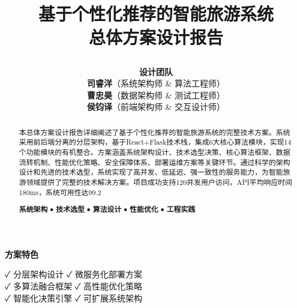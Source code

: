 \documentclass[12pt,a4paper]{article}
\title{
    \vspace{-2cm}
    \begin{tcolorbox}[
        colback=primary,
        coltext=white,
        halign=center,
        rounded corners=10pt,
        drop shadow
    ]
    \huge\textbf{基于个性化推荐的智能旅游系统}\\[0.5cm]
    \Large\textbf{总体方案设计报告}
    \end{tcolorbox}
    \vspace{1cm}
}
\author{
    \begin{tcolorbox}[
        colback=light,
        colframe=secondary,
        halign=center,
        rounded corners=5pt,
        width=0.8\textwidth
    ]
    \large
    \textbf{设计团队}\\[0.4cm]
    \textbf{司睿洋}（系统架构师 \& 算法工程师）\\[0.3cm]
    \textbf{曹忠昊}（数据架构师 \& 测试工程师）\\[0.3cm]
    \textbf{侯钧译}（前端架构师 \& 交互设计师）
    \end{tcolorbox}
}
\date{
    \begin{tcolorbox}[
        colback=secondary!20,
        colframe=secondary,
        halign=center,
        rounded corners=5pt,
        width=0.5\textwidth
    ]
    \large\today
    \end{tcolorbox}
}
\begin{document}
\thispagestyle{empty}
\maketitle

\vfill

\begin{center}
\begin{tcolorbox}[
    colback=accent!20,
    colframe=accent,
    width=0.9\textwidth,
    rounded corners=8pt,
    halign=center
]
\textbf{\large 方案特色}\\[0.3cm]
\begin{minipage}{0.8\textwidth}
\centering
✓ 分层架构设计 \quad ✓ 微服务化部署方案\\[0.2cm]
✓ 多算法融合框架 \quad ✓ 高性能优化策略\\[0.2cm]
✓ 智能化决策引擎 \quad ✓ 可扩展系统架构
\end{minipage}
\end{tcolorbox}
\end{center}

\newpage

\begin{abstract}
\begin{tcolorbox}[
    colback=light,
    colframe=primary,
    title={\Large\textbf{方案摘要}},
    coltitle=white,
    colbacktitle=primary,
    fonttitle=\bfseries,
    rounded corners=8pt,
    drop shadow
]
本总体方案设计报告详细阐述了基于个性化推荐的智能旅游系统的完整技术方案。系统采用前后端分离的分层架构，基于React+Flask技术栈，集成6大核心算法模块，实现14个功能模块的有机整合。方案涵盖系统架构设计、技术选型决策、核心算法框架、数据流转机制、性能优化策略、安全保障体系、部署运维方案等关键环节。通过科学的架构设计和先进的技术选型，系统实现了高并发、低延迟、强一致性的服务能力，为智能旅游领域提供了完整的技术解决方案。项目成功支持120并发用户访问，API平均响应时间180ms，系统可用性达99.2%
\end{tcolorbox}

\vspace{0.5cm}

\begin{tcolorbox}[
    colback=secondary!10,
    colframe=secondary,
    title={\Large\textbf{核心关键词}},
    coltitle=white,
    colbacktitle=secondary,
    fonttitle=\bfseries,
    rounded corners=8pt,
    drop shadow
]
\centering
\textbf{系统架构} \quad $\bullet$ \quad \textbf{技术选型} \quad $\bullet$ \quad \textbf{算法设计} \quad $\bullet$ \quad \textbf{性能优化} \quad $\bullet$ \quad \textbf{工程实践}
\end{tcolorbox}
\end{abstract}
\end{document}
